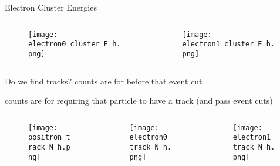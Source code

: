 \documentclass[aspectratio=169]{beamer}
\begin{document}
\begin{frame}{Electron Cluster Energies}
  \begin{columns}
    \begin{column}{0.5\textwidth}
      \begin{figure}
        \centering
        \texttt{[image: electron0\_cluster\_E\_h.png]}
      \end{figure}
    \end{column}
    \begin{column}{0.5\textwidth}
      \begin{figure}
        \centering
        \texttt{[image: electron1\_cluster\_E\_h.png]}
      \end{figure}
    \end{column}
  \end{columns}
\end{frame}

\begin{frame}{Do we find tracks?}
   counts are for before that event cut

   counts are for requiring that particle to have a track (and pass event cuts)

  \begin{columns}
    \begin{column}{0.3\textwidth}
      \begin{figure}
        \centering
        \texttt{[image: positron\_track\_N\_h.png]}
      \end{figure}
    \end{column}
    \begin{column}{0.3\textwidth}
      \begin{figure}
        \centering
        \texttt{[image: electron0\_track\_N\_h.png]}
      \end{figure}
    \end{column}
    \begin{column}{0.3\textwidth}
      \begin{figure}
        \centering
        \texttt{[image: electron1\_track\_N\_h.png]}
      \end{figure}
    \end{column}
  \end{columns}
\end{frame}
\end{document}
